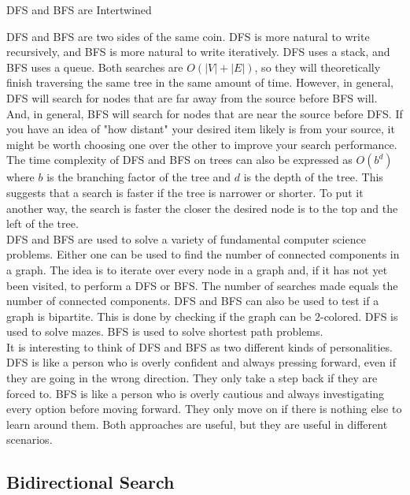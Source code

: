 \begin{bluebox}{DFS and BFS are Intertwined}
    
    DFS and BFS are two sides of the same coin. DFS is more natural to write recursively, and BFS is more natural to write iteratively. DFS uses a stack, and BFS uses a queue. Both searches are $O(|V|+|E|)$, so they will theoretically finish traversing the same tree in the same amount of time. However, in general, DFS will search for nodes that are far away from the source before BFS will. And, in general, BFS will search for nodes that are near the source before DFS. If you have an idea of "how distant" your desired item likely is from your source, it might be worth choosing one over the other to improve your search performance. \\
    
    The time complexity of DFS and BFS on trees can also be expressed as $O(b^d)$ where $b$ is the branching factor of the tree and $d$ is the depth of the tree. This suggests that a search is faster if the tree is narrower or shorter. To put it another way, the search is faster the closer the desired node is to the top and the left of the tree. \\
    
    DFS and BFS are used to solve a variety of fundamental computer science problems. Either one can be used to find the number of connected components in a graph. The idea is to iterate over every node in a graph and, if it has not yet been visited, to perform a DFS or BFS. The number of searches made equals the number of connected components. DFS and BFS can also be used to test if a graph is bipartite. This is done by checking if the graph can be $2$-colored. DFS is used to solve mazes. BFS is used to solve shortest path problems. \\
    
    It is interesting to think of DFS and BFS as two different kinds of personalities. DFS is like a person who is overly confident and always pressing forward, even if they are going in the wrong direction. They only take a step back if they are forced to. BFS is like a person who is overly cautious and always investigating every option before moving forward. They only move on if there is nothing else to learn around them. Both approaches are useful, but they are useful in different scenarios. \\

\end{bluebox}

\subsection{Bidirectional Search}

